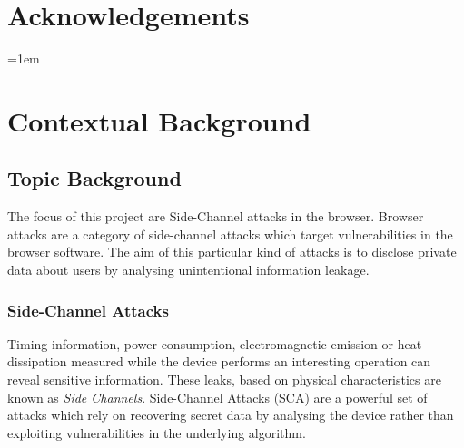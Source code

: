 \documentclass[10pt,a4paper,twoside]{book}
\begin{document}

\chapter*{Acknowledgements}

\noindent


\cleardoublepage
\pagestyle{marked}
\parindent=0in
\parskip=1em 



\chapter{Contextual Background}
\label{chap:context}

\section{Topic Background}

The focus of this project are Side-Channel attacks in the browser. Browser attacks are a category of side-channel attacks which target vulnerabilities in the browser software. The aim of this particular kind of attacks is to disclose private data about users by analysing unintentional information leakage.

\subsection{Side-Channel Attacks}
Timing information, power consumption, electromagnetic emission or heat dissipation measured while the device performs an interesting operation can reveal sensitive information. These leaks, based on physical characteristics are known as \textit{Side Channels}. Side-Channel Attacks (SCA) are a powerful set of attacks which rely on recovering secret data by analysing the device rather than exploiting vulnerabilities in the underlying algorithm.
\end{document}
